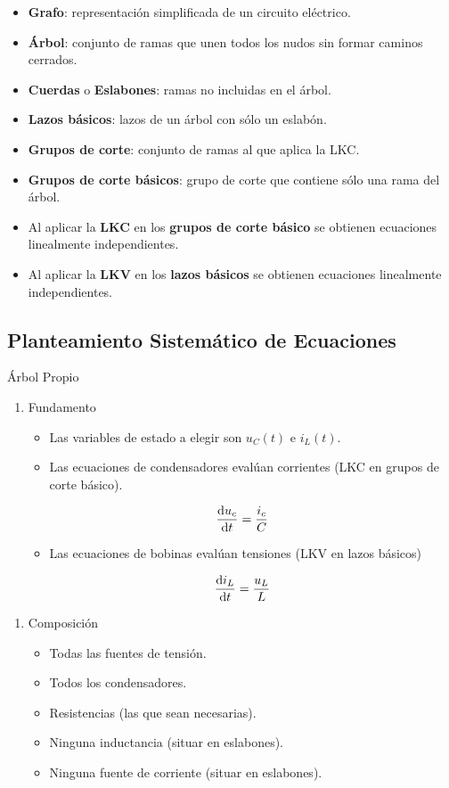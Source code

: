 \begin{itemize}
\item \textbf{Grafo}: representación simplificada de un circuito eléctrico.
\item \textbf{Árbol}: conjunto de ramas que unen todos los nudos sin formar caminos cerrados.
\item \textbf{Cuerdas} o \textbf{Eslabones}: ramas no incluidas en el árbol.
\item \textbf{Lazos básicos}: lazos de un árbol con sólo un eslabón.
\item \textbf{Grupos de corte}: conjunto de ramas al que aplica la LKC.
\item \textbf{Grupos de corte básicos}: grupo de corte que contiene sólo una rama del árbol.
\item Al aplicar la \textbf{LKC} en los \textbf{grupos de corte básico} se obtienen ecuaciones linealmente independientes.
\item Al aplicar la \textbf{LKV} en los \textbf{lazos básicos} se obtienen ecuaciones linealmente independientes.
\end{itemize}

\subsection{Planteamiento Sistemático de Ecuaciones}
{Árbol Propio}

\begin{enumerate}
\item Fundamento
\label{sec:org54256ed}
\begin{itemize}
\item Las variables de estado a elegir son \(u_C(t)\) e \(i_L(t)\).
\item Las ecuaciones de condensadores evalúan corrientes (LKC en grupos de corte básico).
\end{itemize}
\[
\diff{u_c}{t} = \frac{i_c}{C}
\] 
\begin{itemize}
\item Las ecuaciones de bobinas evalúan tensiones (LKV en lazos básicos)
\end{itemize}
\[
\diff{i_L}{t} = \frac{u_L}{L}
\]
\end{enumerate}

\begin{enumerate}
\item Composición
\label{sec:orga2d8ba9}
\begin{itemize}
\item Todas las fuentes de tensión.
\item Todos los condensadores.
\item Resistencias (las que sean necesarias).
\item Ninguna inductancia (situar en eslabones).
\item Ninguna fuente de corriente (situar en eslabones).
\end{itemize}
\end{enumerate}

